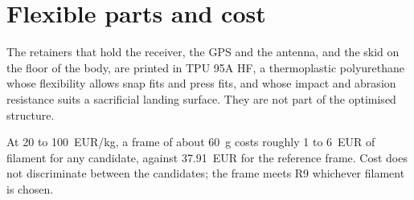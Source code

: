 \section{Flexible parts and cost}\label{sec:material-cost}

The retainers that hold the receiver, the GPS and the antenna, and the skid on the floor of the body, are printed in TPU 95A HF, a thermoplastic polyurethane whose flexibility allows snap fits and press fits, and whose impact and abrasion resistance suits a sacrificial landing surface. They are not part of the optimised structure.

At 20 to \SI{100}{EUR/kg}, a frame of about \SI{60}{g} costs roughly 1 to \SI{6}{EUR} of filament for any candidate, against \SI{37.91}{EUR} for the reference frame. Cost does not discriminate between the candidates; the frame meets R9 whichever filament is chosen.
